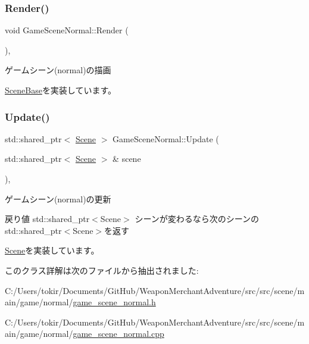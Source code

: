 \mbox{\label{class_game_scene_normal_a1f0ef0b5b194f9f9e7bf857cca7acc39}} 
\subsubsection{\texorpdfstring{Render()}{Render()}}
{\footnotesize\ttfamily void Game\+Scene\+Normal\+::\+Render (\begin{DoxyParamCaption}{ }\end{DoxyParamCaption})\hspace{0.3cm}{\ttfamily [final]}, {\ttfamily [virtual]}}



ゲームシーン(normal)の描画 



\mbox{\hyperlink{class_scene_base_ad981674ce731ea267f398e889bbb9dc3}{Scene\+Base}}を実装しています。

\mbox{\label{class_game_scene_normal_a3e45ac3882f1d0dd5c77ab4f0a1ccb33}} 
\subsubsection{\texorpdfstring{Update()}{Update()}}
{\footnotesize\ttfamily std\+::shared\+\_\+ptr$<$ \mbox{\hyperlink{class_scene}{Scene}} $>$ Game\+Scene\+Normal\+::\+Update (\begin{DoxyParamCaption}\item[{std\+::shared\+\_\+ptr$<$ \mbox{\hyperlink{class_scene}{Scene}} $>$ \&}]{scene }\end{DoxyParamCaption})\hspace{0.3cm}{\ttfamily [final]}, {\ttfamily [virtual]}}



ゲームシーン(normal)の更新 

\begin{DoxyReturn}{戻り値}
std\+::shared\+\_\+ptr$<$\+Scene$>$ シーンが変わるなら次のシーンのstd\+::shared\+\_\+ptr$<$\+Scene$>$を返す 
\end{DoxyReturn}


\mbox{\hyperlink{class_scene_ab71ee5f19764b90c87b4574aa1cb1d25}{Scene}}を実装しています。



このクラス詳解は次のファイルから抽出されました\+:\begin{DoxyCompactItemize}
\item 
C\+:/\+Users/tokir/\+Documents/\+Git\+Hub/\+Weapon\+Merchant\+Adventure/src/src/scene/main/game/normal/\mbox{\hyperlink{game__scene__normal_8h}{game\+\_\+scene\+\_\+normal.\+h}}\item 
C\+:/\+Users/tokir/\+Documents/\+Git\+Hub/\+Weapon\+Merchant\+Adventure/src/src/scene/main/game/normal/\mbox{\hyperlink{game__scene__normal_8cpp}{game\+\_\+scene\+\_\+normal.\+cpp}}\end{DoxyCompactItemize}
